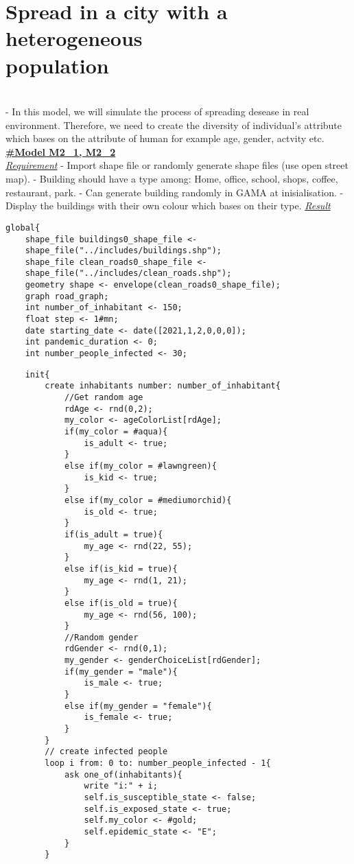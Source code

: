 \documentclass{article}
\begin{document}
\section{Spread in a city with a heterogeneous \\population}
\\- In this model, we will simulate the process of spreading desease in real environment. Therefore, we need to create the diversity of individual's attribute which bases on the attribute of human for example age, gender, actvity etc.
\newpage
\underline{\textbf{#Model M2\_1, M2\_2}}
\\
\underline{\emph{Requirement}}
\newline\newline
- Import shape file or randomly generate shape files (use open street map).
- Building should have a type among: Home, office, school, shops, coffee, restaurant, park.
- Can generate building randomly in GAMA at inisialisation.
- Display the buildings with their own colour which bases on their type.
\newline\newline
\underline{\emph{Result}}\\
\newline\newline
\begin{tcolorbox}
\begin{lstlisting}
global{
	shape_file buildings0_shape_file <- 
	shape_file("../includes/buildings.shp");
	shape_file clean_roads0_shape_file <- 
	shape_file("../includes/clean_roads.shp");
	geometry shape <- envelope(clean_roads0_shape_file);
	graph road_graph;
	int number_of_inhabitant <- 150;
	float step <- 1#mn;
	date starting_date <- date([2021,1,2,0,0,0]);
	int pandemic_duration <- 0;
	int number_people_infected <- 30;
\end{lstlisting}
\end{tcolorbox}
\begin{tcolorbox}
\begin{lstlisting}
	init{
		create inhabitants number: number_of_inhabitant{
			//Get random age
			rdAge <- rnd(0,2);
			my_color <- ageColorList[rdAge];
			if(my_color = #aqua){
				is_adult <- true;
			}
			else if(my_color = #lawngreen){
				is_kid <- true;
			}
			else if(my_color = #mediumorchid){
				is_old <- true;
			}
			if(is_adult = true){
				my_age <- rnd(22, 55);
			}
			else if(is_kid = true){
				my_age <- rnd(1, 21);
			}
			else if(is_old = true){
				my_age <- rnd(56, 100);
			}
			//Random gender
			rdGender <- rnd(0,1);
			my_gender <- genderChoiceList[rdGender];
			if(my_gender = "male"){
				is_male <- true;
			}
			else if(my_gender = "female"){
				is_female <- true;
			}
		}
		// create infected people
		loop i from: 0 to: number_people_infected - 1{
			ask one_of(inhabitants){
				write "i:" + i;
				self.is_susceptible_state <- false;
				self.is_exposed_state <- true;
				self.my_color <- #gold;
				self.epidemic_state <- "E";
			}
		}
\end{lstlisting}
\end{tcolorbox}
\end{document}
